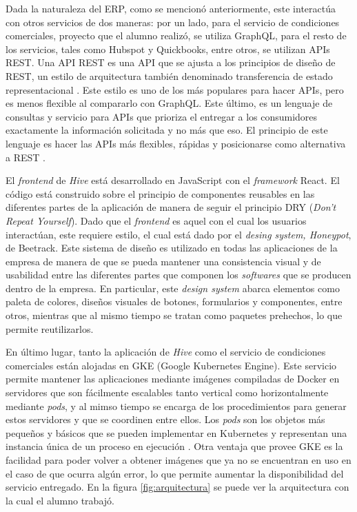    Dada la naturaleza del ERP, como se mencionó anteriormente, este interactúa con otros servicios de dos maneras: por un lado, para el servicio de condiciones comerciales, proyecto que el alumno realizó, se utiliza GraphQL, para el resto de los servicios, tales como Hubspot y Quickbooks, entre otros, se utilizan APIs REST. Una API REST es una API que se ajusta a los principios de diseño de REST, un estilo de arquitectura también denominado transferencia de estado representacional \cite{ibm_api_rest}. Este estilo es uno de los más populares para hacer APIs, pero es menos flexible al compararlo con GraphQL. Este último, es un lenguaje de consultas y servicio para APIs que prioriza el entregar a los consumidores exactamente la información solicitada y no más que eso. El principio de este lenguaje es hacer las APIs más flexibles, rápidas y posicionarse como alternativa a REST \cite{def_graphql}.
   
   El \textit{frontend} de \textit{Hive} está desarrollado en JavaScript con el \textit{framework} React. El código está construido sobre el principio de componentes reusables en las diferentes partes de la aplicación de manera de seguir el principio DRY (\textit{Don't Repeat Yourself}). Dado que el \textit{frontend} es aquel con el cual los usuarios interactúan, este requiere estilo, el cual está dado por el \textit{desing system, Honeypot}, de Beetrack. Este sistema de diseño es utilizado en todas las aplicaciones de la empresa de manera de que se pueda mantener una consistencia visual y de usabilidad entre las diferentes partes que componen los \textit{softwares} que se producen dentro de la empresa. En particular, este \textit{design system} abarca elementos como paleta de colores, diseños visuales de botones, formularios y componentes, entre otros, mientras que al mismo tiempo se tratan como paquetes prehechos, lo que permite reutilizarlos.
   
   En último lugar, tanto la aplicación de \textit{Hive} como el servicio de condiciones comerciales están alojadas en GKE (Google Kubernetes Engine). Este servicio permite mantener las aplicaciones mediante imágenes compiladas de Docker en servidores que son fácilmente escalables tanto vertical como horizontalmente mediante \textit{pods}, y al mimso tiempo se encarga de los procedimientos para generar estos servidores y que se coordinen entre ellos. Los \textit{pods} son los objetos más pequeños y básicos que se pueden implementar en Kubernetes y representan una instancia única de un proceso en ejecución \cite{gke_pods}. Otra ventaja que provee GKE es la facilidad para poder volver a obtener imágenes que ya no se encuentran en uso en el caso de que ocurra algún error, lo que permite aumentar la disponibilidad del servicio entregado. En la figura \ref{fig:arquitectura} se puede ver la arquitectura con la cual el alumno trabajó.


